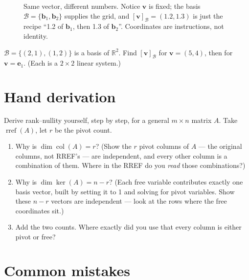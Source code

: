 \begin{figure}[htbp]
\centering

\caption{Same vector, different numbers. Notice $\mathbf v$ is fixed; the basis $\mathcal B=\{\mathbf b_1,\mathbf b_2\}$ supplies the grid, and $[\mathbf v]_{\mathcal B}=(1.2,1.3)$ is just the recipe ``1.2 of $\mathbf b_1$, then 1.3 of $\mathbf b_2$''. Coordinates are instructions, not identity.}
\label{fig:coords}
\end{figure}

\begin{exercise}[medium]
$\mathcal{B}=\{(2,1),(1,2)\}$ is a basis of $\mathbb{R}^2$. Find $[\mathbf{v}]_{\mathcal{B}}$ for $\mathbf{v}=(5,4)$, then for $\mathbf{v}=\mathbf{e}_1$. (Each is a $2\times2$ linear system.)
\end{exercise}

\section{Hand derivation}\label{sec:handderiv3}

Derive rank--nullity yourself, step by step, for a general $m\times n$ matrix $A$. Take $\operatorname{rref}(A)$, let $r$ be the pivot count.
\begin{enumerate}
  \item Why is $\dim\operatorname{col}(A)=r$? (Show the $r$ pivot columns of $A$ — the original columns, not RREF's — are independent, and every other column is a combination of them. Where in the RREF do you \emph{read} those combinations?)
  \item Why is $\dim\ker(A)=n-r$? (Each free variable contributes exactly one basis vector, built by setting it to 1 and solving for pivot variables. Show these $n-r$ vectors are independent — look at the rows where the free coordinates sit.)
  \item Add the two counts. Where exactly did you use that every column is either pivot or free?
\end{enumerate}

\section{Common mistakes}\label{sec:mistakes3}

